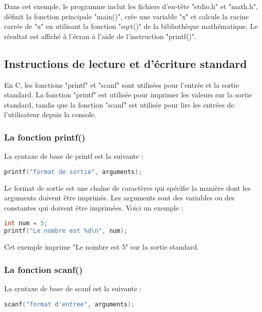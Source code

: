 \documentclass{uofa-eng-assignment}
\begin{document}
\noindent \newline
Dans cet exemple, le programme inclut les fichiers d'en-tête "stdio.h" et "math.h", définit la fonction principale "main()", crée une variable "x" et calcule la racine carrée de "x" en utilisant la fonction "sqrt()" de la bibliothèque mathématique. Le résultat est affiché à l'écran à l'aide de l'instruction "printf()".

\subsection{Instructions de lecture et d'écriture standard}
En C, les fonctions "printf" et "scanf" sont utilisées pour l'entrée et la sortie standard.
\newline \newline
La fonction "printf" est utilisée pour imprimer les valeurs sur la sortie standard, tandis que la fonction "scanf" est utilisée pour lire les entrées de l'utilisateur depuis la console.

\subsubsection{La fonction printf()}
La syntaxe de base de printf est la suivante :
\begin{lstlisting}[language=c]
printf("format de sortie", arguments);
\end{lstlisting}

\noindent \newline
Le format de sortie est une chaîne de caractères qui spécifie la manière dont les arguments doivent être imprimés. Les arguments sont des variables ou des constantes qui doivent être imprimées.
\newline \newline
Voici un exemple :
\begin{lstlisting}[language=c]
int num = 5;
printf("Le nombre est %d\n", num);
\end{lstlisting}
\noindent \newline
Cet exemple imprime "Le nombre est 5" sur la sortie standard.

\subsubsection{La fonction scanf()}
La syntaxe de base de scanf est la suivante :
\begin{lstlisting}[language=c]
scanf("format d'entree", arguments);
\end{lstlisting}
\end{document}
